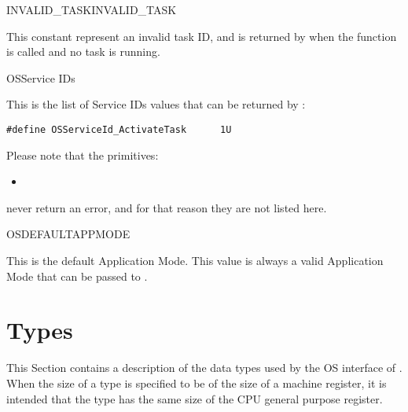 \begin{constant2}{INVALID\_TASK}{INVALID_TASK}
  \begin{constantdescription}
    This constant represent an invalid task ID, and is returned by
     when the function is called and no task is
    running.
  \end{constantdescription}
\end{constant2}

\begin{constant}{OSService IDs}
  \begin{constantdescription}
    This is the list of Service IDs values that can be returned by
    :
    \begin {lstlisting}
#define OSServiceId_ActivateTask      1U
    \end{lstlisting}
    Please note that the primitives:
    \begin{itemize}                              \vspace{-2mm}
      \item {}        \vspace{-2mm}
    \end{itemize}
    never return an error, and for that reason they are not listed
    here.
  \end{constantdescription}
\end{constant}

\begin{constant}{OSDEFAULTAPPMODE}
  \begin{constantdescription}
    This is the default Application Mode. This value is always a valid
    Application Mode that can be passed to .
  \end{constantdescription}
\end{constant}


\pagebreak





\section{Types}
\label{sec:types}

This Section contains a description of the data types used by the OS
interface of \ee. When the size of a type is specified to be of the
size of a machine register, it is intended that the type has the same
size of the CPU general purpose register.

